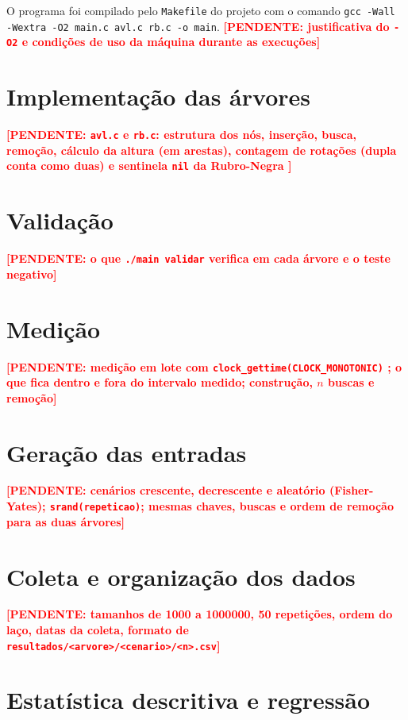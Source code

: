 \documentclass[
    12pt,
    oneside,
    a4paper,
    openany,
    chapter=TITLE,
    english,
    brazil
]{abntex2}
\newcommand{\pendente}[1]{\textcolor{red}{\textbf{[PENDENTE: #1]}}}
\begin{document}
O programa foi compilado pelo \texttt{Makefile} do projeto com o comando \texttt{gcc -Wall -Wextra -O2 main.c avl.c rb.c -o main}. \pendente{justificativa do \texttt{-O2} \cite{gcc2025} e condições de uso da máquina durante as execuções}

\section{Implementação das árvores}

\pendente{\texttt{avl.c} e \texttt{rb.c}: estrutura dos nós, inserção, busca, remoção, cálculo da altura (em arestas), contagem de rotações (dupla conta como duas) e sentinela \texttt{nil} da Rubro-Negra \cite{cormen2012}}

\section{Validação}
\label{sec:validacao}

\pendente{o que \texttt{./main validar} verifica em cada árvore e o teste negativo}

\section{Medição}

\pendente{medição em lote com \texttt{clock\_gettime(CLOCK\_MONOTONIC)} \cite{manclock}; o que fica dentro e fora do intervalo medido; construção, $n$ buscas e remoção}

\section{Geração das entradas}
\label{sec:entradas}

\pendente{cenários crescente, decrescente e aleatório (Fisher-Yates); \texttt{srand(repeticao)}; mesmas chaves, buscas e ordem de remoção para as duas árvores}

\section{Coleta e organização dos dados}

\pendente{tamanhos de \num{1000} a \num{1000000}, 50 repetições, ordem do laço, datas da coleta, formato de \texttt{resultados/<arvore>/<cenario>/<n>.csv}}

\section{Estatística descritiva e regressão}
\label{sec:estatistica}
\end{document}
